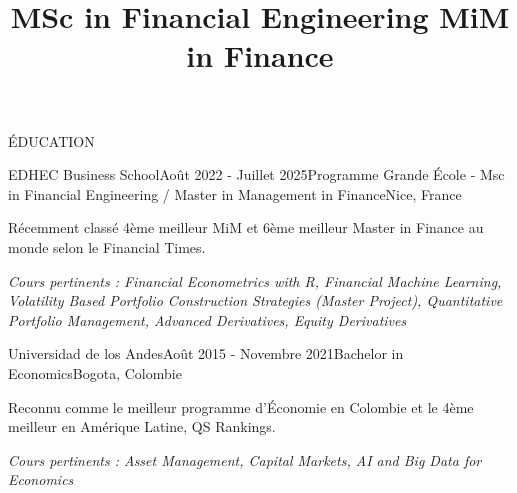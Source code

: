 \documentclass{resume} %
\title{MSc in Financial Engineering \textbar{} MiM in Finance} %
\begin{document}
%
%

\begin{rSection}{ÉDUCATION}

\begin{rSubsection}{EDHEC Business School}{Août 2022 - Juillet 2025}{Programme Grande École - Msc in Financial Engineering / Master in Management in Finance}{Nice, France}
    \item Récemment classé 4ème meilleur MiM et 6ème meilleur Master in Finance au monde selon le Financial Times.
    \item \textit{Cours pertinents : Financial Econometrics with R, Financial Machine Learning, Volatility Based Portfolio Construction Strategies (Master Project), Quantitative Portfolio Management, Advanced Derivatives, Equity Derivatives}
\end{rSubsection}

\begin{rSubsection}{Universidad de los Andes}{Août 2015 - Novembre 2021}{Bachelor in Economics}{Bogota, Colombie}
    \item Reconnu comme le meilleur programme d'Économie en Colombie et le 4ème meilleur en Amérique Latine, QS Rankings.
    \item \textit{Cours pertinents : Asset Management, Capital Markets, AI and Big Data for Economics}
\end{rSubsection}

\end{rSection}


%
%
\end{document}
